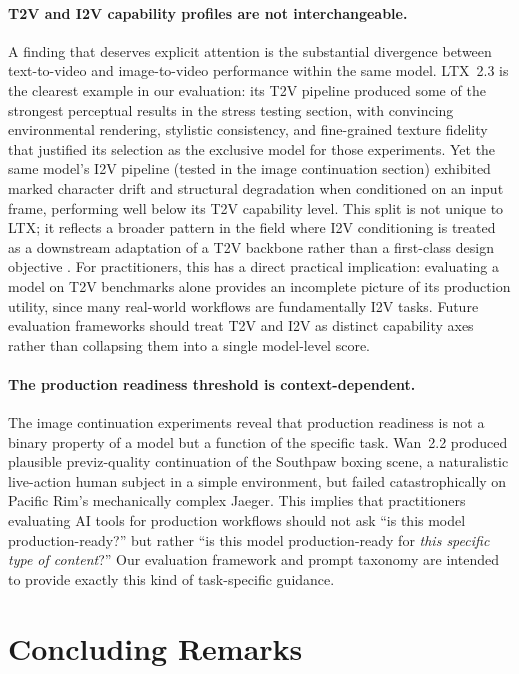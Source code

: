 \documentclass[sigconf]{acmart}
\begin{document}
\paragraph{T2V and I2V capability profiles are not interchangeable.}
A finding that deserves explicit attention is the substantial
divergence between text-to-video and image-to-video performance
within the same model. LTX~2.3 is the clearest example in our
evaluation: its T2V pipeline produced some of the strongest
perceptual results in the stress testing section, with convincing
environmental rendering, stylistic consistency, and fine-grained
texture fidelity that justified its selection as the exclusive
model for those experiments. Yet the same model's I2V pipeline (tested in the image continuation section) exhibited marked
character drift and structural degradation when conditioned on
an input frame, performing well below its T2V capability level.
This split is not unique to LTX; it reflects a broader pattern
in the field where I2V conditioning is treated as a downstream
adaptation of a T2V backbone rather than a first-class design
objective \cite{xie2025comprehensive}. For practitioners, this
has a direct practical implication: evaluating a model on T2V
benchmarks alone provides an incomplete picture of its
production utility, since many real-world workflows are fundamentally I2V tasks. Future
evaluation frameworks should treat T2V and I2V as distinct
capability axes rather than collapsing them into a single
model-level score.

\paragraph{The production readiness threshold is context-dependent.}
The image continuation experiments reveal that production readiness
is not a binary property of a model but a function of the specific
task. Wan~2.2 produced plausible previz-quality continuation of
the Southpaw boxing scene, a naturalistic live-action human subject
in a simple environment, but failed catastrophically on Pacific
Rim's mechanically complex Jaeger. This implies that practitioners
evaluating AI tools for production workflows should not ask
``is this model production-ready?'' but rather ``is this model
production-ready for \textit{this specific type of content}?''
Our evaluation framework and prompt taxonomy are intended to
provide exactly this kind of task-specific guidance.

\section{Concluding Remarks}
\label{sec:remarks}
\end{document}
